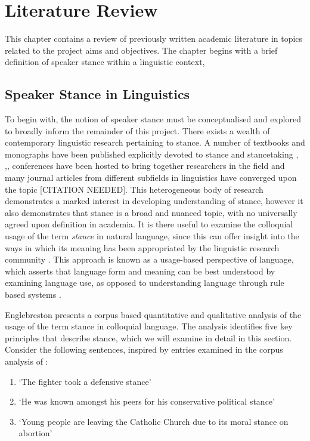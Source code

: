 \documentclass[Dissertation.tex]{subfiles}
\begin{document}
\chapter{Literature Review}
This chapter contains a review of previously written academic literature in topics related to the project aims and objectives. The chapter begins with a brief definition of speaker stance within a linguistic context, 
\section{Speaker Stance in Linguistics}
To begin with, the notion of speaker stance must be conceptualised and explored to broadly inform the remainder of this project. There exists a wealth of contemporary linguistic research pertaining to stance. A number of textbooks and monographs have been published explicitly devoted to stance and stancetaking
\cite{hunstonEvaluationTextAuthorial2000}, \cite{englebretsonStancetakingDiscourseSubjectivity2007},\cite{karkkainenEpistemicStanceEnglish2003}, 
%
conferences have been hosted to bring together researchers in the field
%
%
and  many journal articles from different subfields in linguistics have converged upon the topic [CITATION NEEDED]. This heterogeneous body of research demonstrates a marked interest in developing understanding of stance, however it also demonstrates that stance is a broad and nuanced topic, with no universally agreed upon definition in academia. It is there useful to examine the colloquial usage of the term \textit{stance} in natural language, since this can offer insight into the ways in which its meaning has been appropriated by the linguistic research community \cite{englebretsonStancetakingDiscourseSubjectivity2007}. This approach is known as a usage-based perspective of language, which asserts that language form and meaning can be best understood by examining language use, as opposed to understanding language through rule based systems \cite{barlowUsagebasedModelsLanguage2000}. 

Englebreston \cite{englebretsonStancetakingDiscourseSubjectivity2007} presents a corpus based quantitative and qualitative analysis of the usage of the term stance in colloquial language. The analysis identifies five key principles that describe stance, which we will examine in detail in this section. Consider the following sentences, inspired by entries examined in the corpus analysis of \cite{englebretsonStancetakingDiscourseSubjectivity2007}:


\begin{enumerate}
	\renewcommand{\labelenumi}{(\Alph{enumi})}
	\item `The fighter took a defensive stance'
	\item `He was known amongst his peers for his conservative political stance'
	\item `Young people are leaving the Catholic Church due to its moral stance on abortion'
	\
\end{enumerate}
\end{document}
